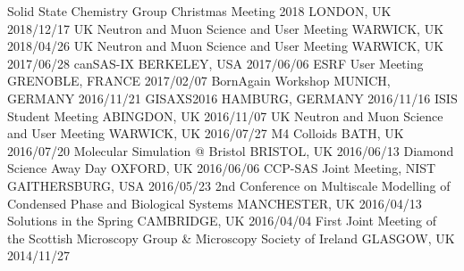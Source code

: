 \begin{cvhonors}
  \cvhonornb
    {Solid State Chemistry Group Christmas Meeting 2018}
    {LONDON, UK}
    {2018/12/17}
  \cvhonornb
    {UK Neutron and Muon Science and User Meeting}
    {WARWICK, UK}
    {2018/04/26}
  \cvhonornb
    {UK Neutron and Muon Science and User Meeting}
    {WARWICK, UK}
    {2017/06/28}
  \cvhonornb
    {canSAS-IX}
    {BERKELEY, USA}
    {2017/06/06}
  \cvhonornb
    {ESRF User Meeting}
    {GRENOBLE, FRANCE}
    {2017/02/07}
  \cvhonornb
    {BornAgain Workshop}
    {MUNICH, GERMANY}
    {2016/11/21}
  \cvhonornb
    {GISAXS2016}
    {HAMBURG, GERMANY}
    {2016/11/16}
  \cvhonornb
    {ISIS Student Meeting}
    {ABINGDON, UK}
    {2016/11/07}
  \cvhonornb
    {UK Neutron and Muon Science and User Meeting}
    {WARWICK, UK}
    {2016/07/27}
  \cvhonornb
    {M4 Colloids}
    {BATH, UK}
    {2016/07/20}
  \cvhonornb
    {Molecular Simulation @ Bristol}
    {BRISTOL, UK}
    {2016/06/13}
  \cvhonornb
    {Diamond Science Away Day}
    {OXFORD, UK}
    {2016/06/06}
  \cvhonornb
    {CCP-SAS Joint Meeting, NIST}
    {GAITHERSBURG, USA}
    {2016/05/23}
  \cvhonornb
    {2nd Conference on Multiscale Modelling of Condensed Phase and Biological Systems}
    {MANCHESTER, UK}
    {2016/04/13}
  \cvhonornb
    {Solutions in the Spring}
    {CAMBRIDGE, UK}
    {2016/04/04}
  \cvhonornb
    {First Joint Meeting of the Scottish Microscopy Group \& Microscopy Society of Ireland}
    {GLASGOW, UK}
    {2014/11/27}
  \end{cvhonors}
